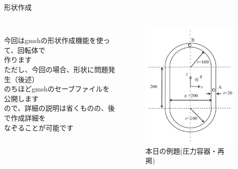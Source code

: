 \begin{frame}{形状作成}
   \begin{columns}[t]
    \begin{column}{0.65\textwidth}
      \\
      今回はgmshの形状作成機能を使って、回転体で\\
      作ります \\
      ただし、今回の場合、形状に問題発生（後述） \\
      \vspace{5mm}
      のちほどgmshのセーブファイルを公開します\\
      ので、詳細の説明は省くものの、後で作成詳細を\\
      なぞることが可能です
    \end{column}
    \begin{column}{0.35\textwidth}
      \begin{figure}[htbp]
        \begin{center}
          \includegraphics[keepaspectratio,scale=2.2]{images/example-probrem.png}
            \caption{本日の例題(圧力容器・再掲)}
        \end{center}
      \end{figure}
    \end{column}
  \end{columns}
\end{frame}
